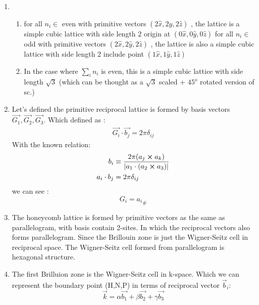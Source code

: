 \documentclass[notitlepage]{revtex4-1}
\begin{document}
\begin{CJK}{UTF8}{bsmi}
\begin{enumerate}
	\item
		\begin{enumerate}[label=(\alph*)] 
			\item 
				\subitem for all $n_i \in$ even with primitive vectors $(2\hat{x} , 2\hat{y} , 2\hat{z})$ , the lattice is a simple cubic lattice with side length 2 origin at $(0\hat{x},0\hat{y},0\hat{z})$
				\subitem for all $n_i \in$ odd with primitive vectors $(2\hat{x} , 2\hat{y} , 2\hat{z})$ , the lattice is also a simple cubic lattice with side length 2 include point $(1\hat{x},1\hat{y},1\hat{z})$ 
			\item 
				\subitem In the case where $\sum_{i} n_i$ is even, this is a simple cubic lattice with side length $\sqrt{3}$ (which can be thought as a $\sqrt{3}$ scaled + $45^o$ rotated version of sc.)
		\end{enumerate}
	\item
		Let's defined the primitive reciprocal lattice is formed by basis vectors $\vec{G_1} , \vec{G_2} , \vec{G_3} $.  Which defined as :
		\begin{equation}
			\begin{split}
				\vec{G_i} \cdot \vec{b_j} = 2\pi \delta_{ij} 
			\end{split}
		\end{equation} 
		With the known relation:
		\begin{equation}
			\begin{split}
				b_i &\equiv \frac{2\pi (a_j \cross a_k)}{|a_1 \cdot (a_2 \cross a_3) |} \\
				a_i \cdot b_j &= 2\pi \delta_{ij}
			\end{split}
		\end{equation}
		we can see :
		\begin{equation}
			G_i = {a_i}_{\#} 
		\end{equation}			
			
	\item The honeycomb lattice is formed by primitive vectors as the same as parallelogram, with basis contain 2-sites. In which the reciprocal vectors also forms parallelogram. Since the Brillouin zone is just the Wigner-Seitz cell in reciprocal space. The Wigner-Seitz cell formed from parallelogram is hexagonal structure.    
	
	\item The first Brilluion zone is the Wigner-Seitz cell in k-space. Which we can represent the boundary point (H,N,P) in terms of reciprocal vector $\vec{b}_i$:
	\begin{equation}
		\vec{k} = \alpha \vec{b_1} + \beta \vec{b_2} + \gamma \vec{b_3} 
	\end{equation}
	

\end{enumerate}
\end{CJK}
\end{document}
